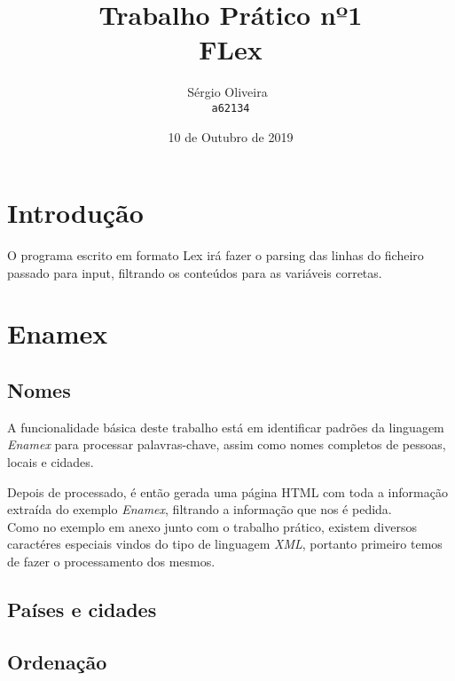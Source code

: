\documentclass[11pt,a4paper]{report}
\begin{document}
\title{Trabalho Prático nº1 \\FLex}
\author{
   Sérgio Oliveira~\\
   \texttt{a62134}
   }
\date{10 de Outubro de 2019}
\maketitle
\raggedbottom
\pagebreak
\pagebreak


\tableofcontents
\pagebreak
\chapter{Introdução}

O programa escrito em formato Lex irá fazer o parsing das linhas do ficheiro passado para input, filtrando os conteúdos para as variáveis corretas.

\raggedbottom
\pagebreak


\chapter{Enamex}
\section{Nomes}

A funcionalidade básica deste trabalho está em identificar padrões da linguagem \textit{Enamex} para processar palavras-chave, assim como nomes completos de pessoas, locais e cidades.

Depois de processado, é então gerada uma página HTML com toda a informação extraída do exemplo \textit{Enamex}, filtrando a informação que nos é pedida.
~\\
Como no exemplo em anexo junto com o trabalho prático, existem diversos caractéres especiais vindos do tipo de linguagem \textit{XML}, portanto primeiro temos de fazer o processamento dos mesmos.



\pagebreak
\section{Países e cidades}
\pagebreak
\section{Ordenação}
\end{document}
